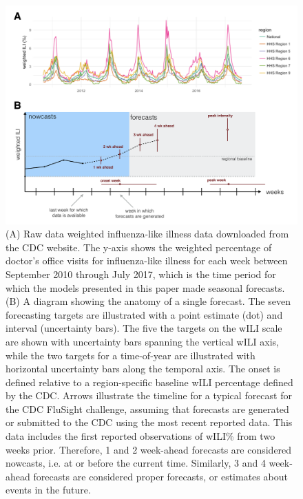 \documentclass{article}
\begin{document}
\begin{figure}[htbp]
\begin{center}
\includegraphics[width=\textwidth]{static-figures/timezero-sketch.pdf}
\caption{(A) Raw data weighted influenza-like illness data downloaded from the CDC website. The y-axis shows the weighted percentage of doctor's office visits for influenza-like illness for each week between September 2010 through July 2017, which is the time period for which the models presented in this paper made seasonal forecasts. (B) A diagram showing the anatomy of a single forecast. The seven forecasting targets are illustrated with a point estimate (dot) and interval (uncertainty bars). The five the targets on the wILI scale are shown with uncertainty bars spanning the vertical wILI axis, while the two targets for a time-of-year are illustrated with horizontal uncertainty bars along the temporal axis. The onset is defined relative to a region-specific baseline wILI percentage defined by the CDC. Arrows illustrate the timeline for a typical forecast for the CDC FluSight challenge, assuming that forecasts are generated or submitted to the CDC using the most recent reported data. This data includes the first reported observations of wILI\% from two weeks prior. Therefore, 1 and 2 week-ahead forecasts are considered nowcasts, i.e. at or before the current time. Similarly, 3 and 4 week-ahead forecasts are considered proper forecasts, or estimates about events in the future.}
\label{fig:intro-schematic}
\end{center}
\end{figure}
\end{document}
